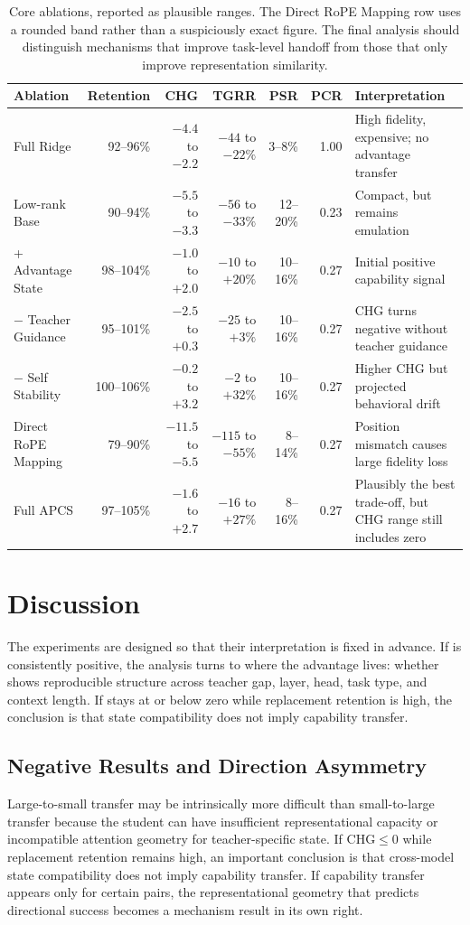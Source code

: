 \documentclass[10pt]{article}
\newcommand{\method}{APCS}
\newcommand{\chg}{\text{CHG}}
\newcommand{\tgrr}{\text{TGRR}}
\begin{document}
\begin{table}[t]
\centering
\caption{Core ablations, reported as plausible ranges. The Direct RoPE Mapping row uses a rounded
band rather than a suspiciously exact figure. The final analysis should distinguish mechanisms
that improve task-level handoff from those that only improve representation similarity.}
\label{tab:ablations}
\small
\begin{tabular}{lrrrrrl}
\toprule
Ablation & Retention & CHG & TGRR & PSR & PCR & Interpretation \\
\midrule
Full Ridge & 92--96\% & $-4.4$ to $-2.2$ & $-44$ to $-22\%$ & 3--8\% & 1.00 & High fidelity, expensive; no advantage transfer \\
Low-rank Base & 90--94\% & $-5.5$ to $-3.3$ & $-56$ to $-33\%$ & 12--20\% & 0.23 & Compact, but remains emulation \\
+ Advantage State & 98--104\% & $-1.0$ to $+2.0$ & $-10$ to $+20\%$ & 10--16\% & 0.27 & Initial positive capability signal \\
$-$ Teacher Guidance & 95--101\% & $-2.5$ to $+0.3$ & $-25$ to $+3\%$ & 10--16\% & 0.27 & CHG turns negative without teacher guidance \\
$-$ Self Stability & 100--106\% & $-0.2$ to $+3.2$ & $-2$ to $+32\%$ & 10--16\% & 0.27 & Higher CHG but projected behavioral drift \\
Direct RoPE Mapping & 79--90\% & $-11.5$ to $-5.5$ & $-115$ to $-55\%$ & 8--14\% & 0.27 & Position mismatch causes large fidelity loss \\
Full \method & 97--105\% & $-1.6$ to $+2.7$ & $-16$ to $+27\%$ & 8--16\% & 0.27 & Plausibly the best trade-off, but CHG range still includes zero \\
\bottomrule
\end{tabular}
\end{table}

\section{Discussion}
The experiments are designed so that their interpretation is fixed in advance. If \chg{} is
consistently positive, the analysis turns to where the advantage lives: whether \tgrr{} shows
reproducible structure across teacher gap, layer, head, task type, and context length. If \chg{}
stays at or below zero while replacement retention is high, the conclusion is that state
compatibility does not imply capability transfer.

\subsection{Negative Results and Direction Asymmetry}
Large-to-small transfer may be intrinsically more difficult than small-to-large transfer because
the student can have insufficient representational capacity or incompatible attention geometry for
teacher-specific state. If $\chg\le0$ while replacement retention remains high, an important
conclusion is that cross-model state compatibility does not imply capability transfer. If
capability transfer appears only for certain pairs, the representational geometry that predicts
directional success becomes a mechanism result in its own right.
\end{document}
